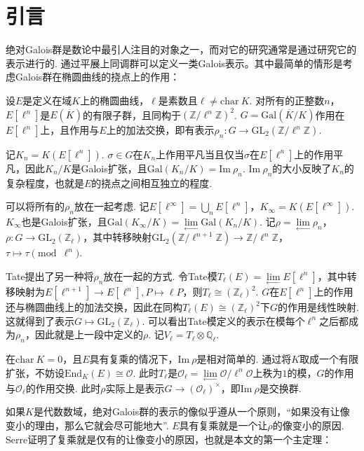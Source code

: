 \section{引言}

绝对Galois群是数论中最引人注目的对象之一，而对它的研究通常是通过研究它的表示进行的.
通过平展上同调群可以定义一类Galois表示。其中最简单的情形是考虑Galois群在椭圆曲线的挠点上的作用：

设$E$是定义在域$K$上的椭圆曲线，$\ell$是素数且$\ell\neq \mathrm{char}\ K$. 对所有的正整数$n$，$E[\ell^n]$是$E(\overline{K})$的有限子群，且同构于$(\mathbb{Z}/\ell^n\mathbb{Z})^2$. $G = \mathrm{Gal}(\overline{K}/K)$作用在$E[\ell^n]$上，且作用与$E$上的加法交换，即有表示$\rho_n:G\to \mathrm{GL}_2(\mathbb{Z}/\ell^n \mathbb{Z})$.

记$K_n=K(E[\ell^n])$. $\sigma\in G$在$K_n$上作用平凡当且仅当$\sigma$在$E[\ell^n]$上的作用平凡，因此$K_n/K$是Galois扩张，且$\mathrm{Gal}(K_n/K)=\mathrm{Im}\ \rho_n$. $\mathrm{Im}\ \rho_n$的大小反映了$K_n$的复杂程度，也就是$E$的挠点之间相互独立的程度.

可以将所有的$\rho_n$放在一起考虑. 记$E[\ell^{\infty}]=\bigcup_n E[\ell^n]$，$K_{\infty} = K(E[\ell^{\infty}])$. $K_{\infty}$也是Galois扩张，且$\mathrm{Gal}(K_{\infty}/K) = \lim\limits_{\longleftarrow} \mathrm{Gal}(K_n/K)$. 记$\rho = \lim\limits_{\longleftarrow} \rho_n$，$\rho: G\to \mathrm{GL}_2(\mathbb{Z}_{\ell})$，其中转移映射$\mathrm{GL}_2(\mathbb{Z}/\ell^{n+1} \mathbb{Z}) \to \mathbb{Z}/\ell^n \mathbb{Z}$，$\tau \mapsto \tau \pmod{\ell^n}$.

Tate提出了另一种将$\rho_n$放在一起的方式. 令Tate模$T_{\ell}(E) = \lim\limits_{\longleftarrow} E[\ell^n]$，其中转移映射为$E[\ell^{n+1}]\to E[\ell^n], P\mapsto \ell P$，则$T_{\ell}\cong (\mathbb{Z}_{\ell})^2$. $G$在$E[\ell^n]$上的作用还与椭圆曲线上的加法交换，因此在同构$T_{\ell}(E)\cong (\mathbb{Z}_{\ell})^2$下$G$的作用是线性映射. 这就得到了表示$G\mapsto \mathrm{GL}_2(\mathbb{Z}_{\ell})$. 可以看出Tate模定义的表示在模每个$\ell^n$之后都成为$\rho_n$，因此就是上一段中定义的$\rho$.
记$V_{\ell} = T_{\ell}\otimes \mathbb{Q}_{\ell}$.

在$\mathrm{char}\ K = 0$，且$E$具有复乘的情况下，$\mathrm{Im}\ \rho$是相对简单的. 通过将$K$取成一个有限扩张，不妨设$\mathrm{End}_K(E) \cong \mathcal{O}$. 此时$T_{\ell}$是$\mathcal{O}_{\ell} = \lim\limits_{\longleftarrow}\mathcal{O}/\ell^n \mathcal{O}$上秩为$1$的模，$G$的作用与$\mathcal{O}_{\ell}$的作用交换. 此时$\rho$实际上是表示$G\to (\mathcal{O}_{\ell})^{\times}$，即$\mathrm{Im}\ \rho$是交换群.

如果$K$是代数数域，绝对Galois群的表示的像似乎遵从一个原则，“如果没有让像变小的理由，那么它就会尽可能地大”. $E$具有复乘就是一个让$\rho$的像变小的原因. Serre证明了复乘就是仅有的让像变小的原因，也就是本文的第一个主定理：

